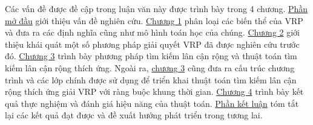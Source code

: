 Các vấn đề được đề cập trong luận văn này được trình bày trong 4 chương. \hyperref[chap:introduction]{Phần mở đầu} giới thiệu vấn đề nghiên cứu. \hyperref[chap:model]{Chương 1} phân loại các biến thể của VRP và đưa ra các định nghĩa cũng như mô hình toán học của chúng.
\hyperref[chap:solution]{Chương 2} giới thiệu khái quát một số  phương pháp giải quyết VRP đã được nghiên cứu trước đó.
\hyperref[chap:search]{Chương 3} trình bày phương pháp tìm kiếm lân cận rộng và thuật toán tìm kiếm lân cận rộng thích ứng. Ngoài ra, \hyperref[chap:search]{chương 3} cũng đưa ra cấu trúc chương trình và các lớp chính được sử dụng để triển khai thuật toán tìm kiếm lân cận rộng thích ứng giải VRP với ràng buộc khung thời gian.
\hyperref[chap:experiment]{Chương 4} trình bày kết quả thực nghiệm và đánh giá hiệu năng của thuật toán.
\hyperref[chap:conclusion]{Phần kết luận} tóm tắt lại các kết quả đạt được và đề xuất hướng phát triển trong tương lai.
